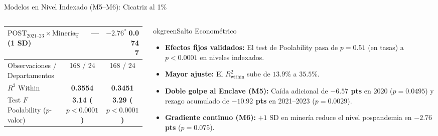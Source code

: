 \begin{frame}{Modelos en Nivel Indexado (M5--M6): Cicatriz al 1\%}
\begin{columns}[T,onlytextwidth]
\begin{column}{0.57\textwidth}
\begin{ccdebox}[left=2mm,right=2mm,top=1mm,bottom=1mm]
{\begin{tabular}{@{}l r r r r@{}}
\rowcolor{ccdelight!22}
$\text{POST}_{2021\text{--}23} \times \text{Minería}_z$ (1 SD) & --- & --- & \textcolor{ccdeblue}{$\mathbf{-2.76^{*}}$} & \textcolor{ccdeblue}{\textbf{0.0747}} \\
\midrule
Observaciones / Departamentos & \multicolumn{2}{c}{168 / 24} & \multicolumn{2}{c}{168 / 24} \\
$R^2$ Within & \multicolumn{2}{c}{\textcolor{okgreen}{\textbf{0.3554}}} & \multicolumn{2}{c}{\textcolor{okgreen}{\textbf{0.3451}}} \\
Test $F$ Poolability ($p$-valor) & \multicolumn{2}{c}{\textbf{3.14 ($p < 0.0001$)}} & \multicolumn{2}{c}{\textbf{3.29 ($p < 0.0001$)}} \\
\bottomrule
\end{tabular}%
}
\end{ccdebox}
\end{column}

\begin{column}{0.40\textwidth}
\begin{contrastbox}{okgreen}{Salto Econométrico}
\scriptsize\RaggedRight
\begin{itemize}\setlength{\itemsep}{0.12em}
  \item \textbf{Efectos fijos validados:} El test de Poolability pasa de $p=0.51$ (en tasas) a \textbf{$p < 0.0001$} en niveles indexados.
  \item \textbf{Mayor ajuste:} El $R^2_{\text{within}}$ sube de $13.9\%$ a \textbf{$35.5\%$}.
  \item \textbf{Doble golpe al Enclave (M5):} Caída adicional de \textbf{$-6.57$ pts} en 2020 ($p=0.0495$) y rezago acumulado de \textbf{$-10.92$ pts} en 2021--2023 ($p=0.0029$).
  \item \textbf{Gradiente continuo (M6):} $+1\text{ SD}$ en minería reduce el nivel pospandemia en \textbf{$-2.76$ pts} ($p=0.075$).
\end{itemize}
\end{contrastbox}
\end{column}
\end{columns}
\end{frame}

